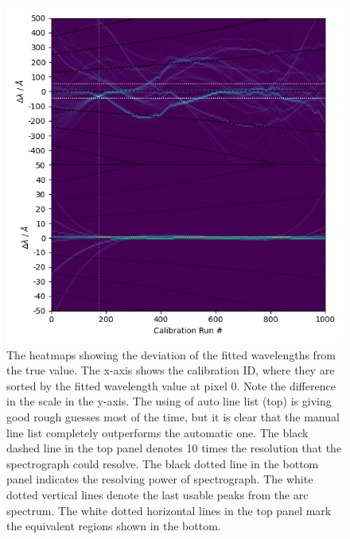 \documentclass{aa}
\begin{document}
\begin{figure}[h]
    \centering
    \includegraphics[width=\columnwidth]{plots/figure_5_heatmap.png}
    \caption{The heatmaps showing the deviation of the fitted wavelengths from the
    true value. The x-axis shows the calibration ID, where they are sorted by the
    fitted wavelength value at pixel 0. Note the difference in the scale in the y-axis.
    The using of auto line list (top) is giving good rough guesses most of the time,
    but it is clear that the manual line list completely outperforms the automatic
    one. The black dashed line in the top panel denotes 10 times the resolution that
    the spectrograph could resolve. The black dotted line in the bottom panel indicates
    the resolving power of spectrograph. The white dotted vertical lines denote the
    last usable peaks from the arc spectrum. The white dotted horizontal
    lines in the top panel mark the equivalent regions shown in the bottom. }
    \label{fig:heatmap}
\end{figure}
\end{document}
